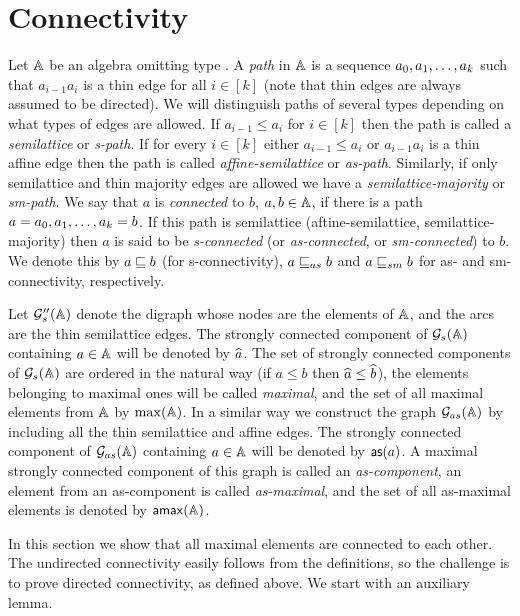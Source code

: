 \documentclass[11pt]{article}
\begin{document}
\section{Connectivity}\label{sec:connectivity}

Let ${\mathbb A}$ be an algebra omitting type \one. A \emph{path} in ${\mathbb A}$ is a sequence 
$a_0,a_1,\ldots, a_k$ such that $a_{i-1}a_i$ is a thin edge for all $i\in[k]$ (note that thin 
edges are always assumed to be directed). We will 
distinguish paths of several types depending on what types of edges are allowed. 
If $a_{i-1}\le a_i$ for $i\in[k]$ then the path is called a \emph{semilattice} or 
\emph{s-path}. If for every $i\in[k]$ either $a_{i-1}\le a_i$ or $a_{i-1}a_i$ is a thin
affine edge then the path is called \emph{affine-semilattice} or \emph{as-path}. 
Similarly, if only semilattice and thin majority edges are allowed we have a 
\emph{semilattice-majority} or \emph{sm-path}. 
We say that $a$ is \emph{connected} to $b$, $a,b\in{\mathbb A}$, if there is a path 
$a=a_0,a_1,\ldots, a_k=b$. If this path is semilattice (aftine-semilattice, 
semilattice-majority) then $a$ is said to be \emph{s-connected} (or \emph{as-connected},
or \emph{sm-connected}) to $b$. We denote this by $a\sqsubseteq b$ (for s-connectivity),
$a\sqsubseteq_{as}b$ and $a\sqsubseteq_{sm}b$ for as- and sm-connectivity, respectively.

Let ${\mathcal G}''_s({\mathbb A})$ denote the digraph whose nodes are the elements of ${\mathbb A}$, and
the arcs are the thin semilattice edges. The strongly connected component of ${\mathcal G}_s({\mathbb A})$
containing $a\in{\mathbb A}$ will be denoted by $\widehat a$. The set of strongly connected 
components of ${\mathcal G}_s({\mathbb A})$ are ordered in the natural way (if $a\le b$ then $\widehat a\le \widehat b$), 
the elements belonging to maximal ones will be called \emph{maximal}, and
the set of all maximal elements from ${\mathbb A}$ by $\max({\mathbb A})$. In a similar way
we construct the graph ${\mathcal G}_{as}({\mathbb A})$ by including all the thin semilattice and 
affine edges. The strongly connected component of ${\mathcal G}_{as}({\mathbb A})$ containing
$a\in{\mathbb A}$ will be denoted by $\mathsf{as}(a)$. A maximal strongly connected component 
of this graph is called an \emph{as-component}, an element from an as-component 
is called \emph{as-maximal}, and the set of all as-maximal elements is denoted by 
$\mathsf{amax}({\mathbb A})$.

In this section we show that all maximal elements are connected to each other.
The undirected connectivity easily follows from the definitions, so the challenge 
is to prove directed connectivity, as defined above. We start with an auxiliary lemma.
\end{document}
